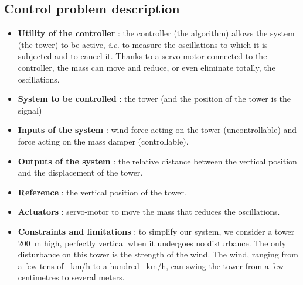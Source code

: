 \subsection{Control problem description}
\begin{itemize}
    \item {\bf Utility of the controller} : the controller (the algorithm) allows the system (the tower) to be active, {\it i.e.} to measure the oscillations to which it is subjected and to cancel it. Thanks to a servo-motor connected to the controller, the mass can move and reduce, or even eliminate totally, the oscillations.
    \item {\bf System to be controlled} : the tower (and the position of the tower is the signal)
    \item {\bf Inputs of the system} : wind force acting on the tower (uncontrollable) and force acting on the mass damper (controllable).
    \item {\bf Outputs of the system} : the relative distance between the vertical position and the displacement of the tower.
    \item {\bf Reference} : the vertical position of the tower.
    \item {\bf Actuators} : servo-motor to move the mass that reduces the oscillations.
    \item {\bf Constraints and limitations} : to simplify our system, we consider a tower \SI{200}{\meter} high, perfectly vertical when it undergoes no disturbance. The only disturbance on this tower is the strength of the wind. The wind, ranging from a few tens of \SI{}{\kilo\meter/\hour} to a hundred \SI{}{\kilo\meter/\hour}, can swing the tower from a few centimetres to several meters.
\end{itemize}
